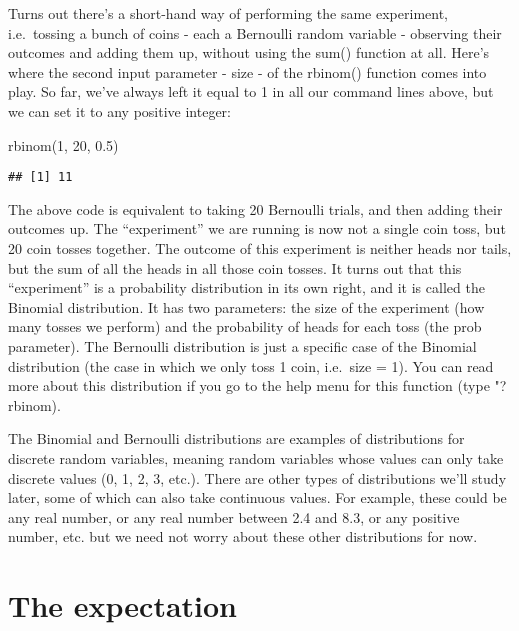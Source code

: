 \documentclass[
]{book}
\newenvironment{Shaded}{\begin{snugshade}}{\end{snugshade}}
\newcommand{\DecValTok}[1]{\textcolor[rgb]{0.00,0.00,0.81}{#1}}
\newcommand{\FloatTok}[1]{\textcolor[rgb]{0.00,0.00,0.81}{#1}}
\newcommand{\FunctionTok}[1]{\textcolor[rgb]{0.00,0.00,0.00}{#1}}
\newcommand{\NormalTok}[1]{#1}
\begin{document}
Turns out there's a short-hand way of performing the same experiment, i.e.~tossing a bunch of coins - each a Bernoulli random variable - observing their outcomes and adding them up, without using the sum() function at all. Here's where the second input parameter - size - of the rbinom() function comes into play. So far, we've always left it equal to 1 in all our command lines above, but we can set it to any positive integer:

\begin{Shaded}
\begin{Highlighting}[]
\FunctionTok{rbinom}\NormalTok{(}\DecValTok{1}\NormalTok{, }\DecValTok{20}\NormalTok{, }\FloatTok{0.5}\NormalTok{)}
\end{Highlighting}
\end{Shaded}

\begin{verbatim}
## [1] 11
\end{verbatim}

The above code is equivalent to taking 20 Bernoulli trials, and then adding their outcomes up. The ``experiment'' we are running is now not a single coin toss, but 20 coin tosses together. The outcome of this experiment is neither heads nor tails, but the sum of all the heads in all those coin tosses. It turns out that this ``experiment'' is a probability distribution in its own right, and it is called the Binomial distribution. It has two parameters: the size of the experiment (how many tosses we perform) and the probability of heads for each toss (the prob parameter). The Bernoulli distribution is just a specific case of the Binomial distribution (the case in which we only toss 1 coin, i.e.~size = 1). You can read more about this distribution if you go to the help menu for this function (type "?rbinom).

The Binomial and Bernoulli distributions are examples of distributions for discrete random variables, meaning random variables whose values can only take discrete values (0, 1, 2, 3, etc.). There are other types of distributions we'll study later, some of which can also take continuous values. For example, these could be any real number, or any real number between 2.4 and 8.3, or any positive number, etc. but we need not worry about these other distributions for now.

\hypertarget{the-expectation}{%
\section{The expectation}\label{the-expectation}}
\end{document}
